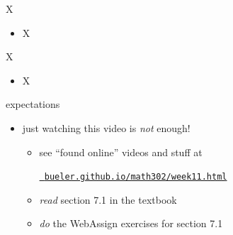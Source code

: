 \documentclass[urlcolor=blue,dvipsnames]{beamer}
\begin{document}
\begin{frame}{X}

\begin{itemize}
\item X
\end{itemize}
\end{frame}


\begin{frame}{X}

\begin{itemize}
\item X
\end{itemize}
\end{frame}


\begin{frame}{expectations}

\begin{itemize}
\item just watching this video is \emph{not} enough!
     \begin{itemize}
     \item see ``found online'' videos and stuff at

     \centerline{\href{https://bueler.github.io/math302/week10.html}{\tt \color{cyan} bueler.github.io/math302/week11.html}}
     \item \emph{read} section 7.1 in the textbook
     \item \emph{do} the WebAssign exercises for section 7.1
     \end{itemize}
\end{itemize}
\end{frame}
\end{document}
